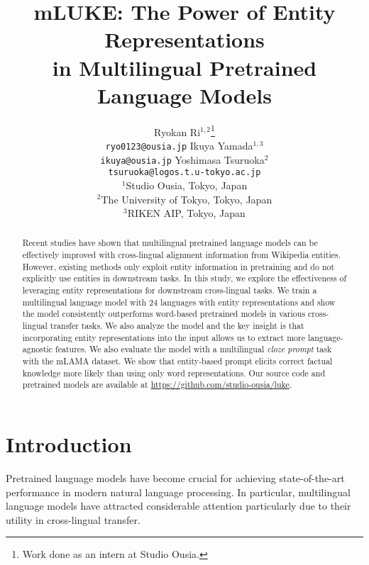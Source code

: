 \documentclass[11pt]{article}
\title{mLUKE: The Power of Entity Representations\\in Multilingual Pretrained Language Models}
\author{
Ryokan Ri$^{1,2}$\thanks{\hspace{2mm}Work done as an intern at Studio Ousia.}\\
    {\small \texttt{ryo0123@ousia.jp}}
    \And
    Ikuya Yamada$^{1,3}$\\
    {\small \texttt{ikuya@ousia.jp}}
    \And
    Yoshimasa Tsuruoka$^{2}$\\
    {\small \texttt{tsuruoka@logos.t.u-tokyo.ac.jp}}
    \AND
    \begin{minipage}{\textwidth}
        \begin{center}
            \fontsize{11.5}{14}\selectfont
            \textnormal{$^1$Studio Ousia, Tokyo, Japan \\ $^2$The University of Tokyo, Tokyo, Japan \\ $^3$RIKEN AIP, Tokyo, Japan}\\ \end{center}
    \end{minipage}
}
\begin{document}
\maketitle
\begin{abstract}
Recent studies have shown that multilingual pretrained language models can be effectively improved with cross-lingual alignment information from Wikipedia entities.
However, existing methods only exploit entity information in pretraining and do not explicitly use entities in downstream tasks.
In this study, we explore the effectiveness of leveraging entity representations for downstream cross-lingual tasks.
We train a multilingual language model with 24 languages with entity representations and show
the model consistently outperforms word-based pretrained models in various cross-lingual transfer tasks.
We also analyze the model and the key insight is that incorporating entity representations into the input allows us to extract more language-agnostic features.
We also evaluate the model with a multilingual {\it cloze prompt} task with the mLAMA dataset.
We show that entity-based prompt elicits correct factual knowledge more likely than using only word representations.
Our source code and pretrained models are available at \url{https://github.com/studio-ousia/luke}. \end{abstract}

\newcommand{\mask}{\texttt{[MASK]}}

\newcommand{\sentence}[1]{``{\it #1}''}
\newcommand{\word}[1]{{\it #1}}

\newcommand{\mluke}{mLUKE}
\newcommand{\mbert}{mBERT}
\newcommand{\xlmr}{XLM-R}
\newcommand{\extraTraining}{+ extra training}
\newcommand{\mlukeW}{mLUKE-W}
\newcommand{\mlukeE}{mLUKE-E}
\newcommand{\xlmk}{XLM-K}

\newcommand{\ba}{$\rm{_{base}}$}
\newcommand{\la}{$\rm{_{large}}$}

\newcommand{\X}{\texttt{[X]}}
\newcommand{\Y}{\texttt{[Y]}}
\newcommand{\mlukeEwithY}{\mlukeE{}\ba{} (\Y{})}
\newcommand{\mlukeEwithXY}{\mlukeE{}\ba{} (\X{} \& \Y{})}
 \section{Introduction}
Pretrained language models have become crucial for achieving state-of-the-art performance in modern natural language processing.
In particular, multilingual language models \citep{NEURIPS2019_c04c19c2,conneau-etal-2020-unsupervised,Doddapaneni2021APO} have attracted considerable attention particularly due to their utility in cross-lingual transfer.
\end{document}
